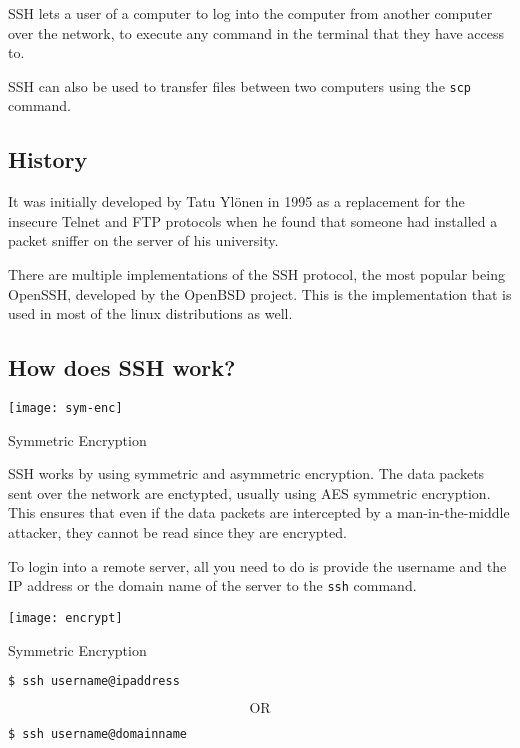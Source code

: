 SSH lets a user of a computer to log into the computer
from another computer over the network, to execute
any command in the terminal that they have access to.

SSH can also be used to transfer files between two
computers using the \texttt{scp} command.

\subsection{History}

It was initially developed by Tatu Ylönen in
1995 as a replacement for the insecure Telnet and FTP
protocols when he found that someone had installed a
packet sniffer on the server of his university.

There are multiple implementations of the SSH protocol,
the most popular being OpenSSH, developed by the OpenBSD
project.
This is the implementation that is used in most of the
linux distributions as well.

\subsection{How does SSH work?}

\begin{marginfigure}
  \texttt{[image: sym-enc]}
  \caption{Symmetric Encryption}
\end{marginfigure}

SSH works by using symmetric and asymmetric encryption.
The data packets sent over the network are enctypted,
usually using AES symmetric encryption.
This ensures that even if the data packets are intercepted
by a man-in-the-middle attacker, they cannot be read
since they are encrypted.

To login into a remote server, all you need to do is
provide the username and the IP address or the domain
name of the server to the \texttt{ssh} command.

\begin{marginfigure}
  \texttt{[image: encrypt]}
  \caption{Symmetric Encryption}
\end{marginfigure}

\begin{lstlisting}[language=bash]
$ ssh username@ipaddress
\end{lstlisting}

\[
  \text{OR}
\]

\begin{lstlisting}[language=bash]
$ ssh username@domainname
\end{lstlisting}

